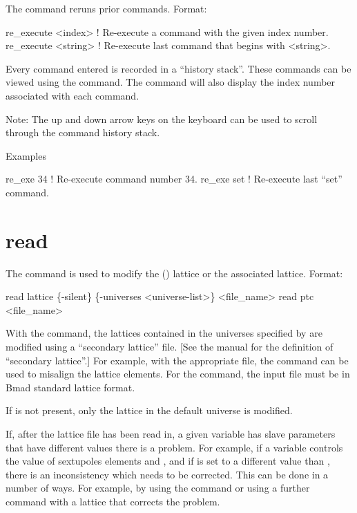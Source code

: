 The  command reruns prior commands.  Format:
\begin{example}
  re_execute <index>   ! Re-execute a command with the given index number.
  re_execute <string>  ! Re-execute last command that begins with <string>.
\end{example}

\vskip 10pt 

Every \tao command entered is recorded in a ``history stack''. These commands can be viewed using
the  command. The  command will also display the index number
associated with each command.

Note: The up and down arrow keys on the keyboard can be used to scroll through the command history
stack.

Examples
\begin{example}
  re_exe 34   ! Re-execute command number 34.
  re_exe set  ! Re-execute last ``set'' command.  
\end{example}

\section{read}
\label{s:read}

The  command is used to modify the (\bmad)  lattice or the associated 
lattice. Format:
\begin{example}
  read lattice \{-silent\} \{-universes <universe-list>\} <file_name>
  read ptc <file_name>
\end{example}

\vskip 10pt 

With the  command, the  lattices contained in the universes specified by
 are modified using a ``secondary lattice'' file.  [See the \bmad manual for the
definition of ``secondary lattice''.] For example, with the appropriate file, the  command
can be used to misalign the lattice elements. For the  command, the input file must
be in Bmad standard lattice format.

If  is not present, only the  lattice
in the default universe is modified.

If, after the lattice file has been read in, a given \tao variable has slave parameters that have
different values there is a problem. For example, if a \tao variable controls the  value of
sextupoles elements  and , and if  is set to a different value than ,
there is an inconsistency which needs to be corrected. This can be done in a number of ways. For
example, by using the  command or using a further  command with
a lattice that corrects the problem.

